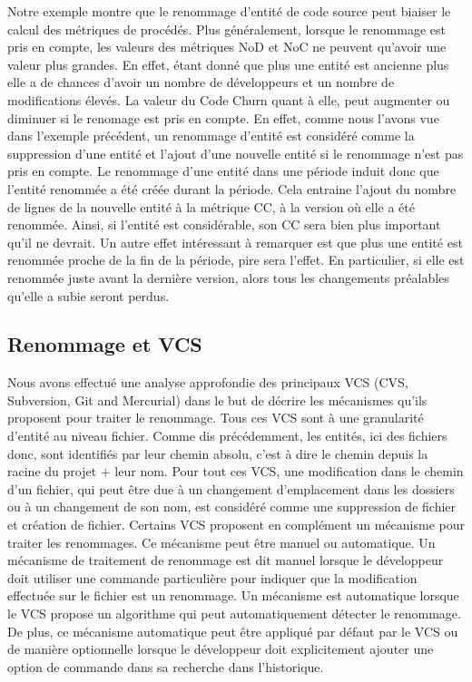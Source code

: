 Notre exemple montre que le renommage d'entité de code source peut biaiser le calcul des métriques de procédés. Plus généralement, lorsque le renommage est pris en compte, les valeurs des métriques NoD et NoC ne peuvent qu'avoir une valeur plus grandes. En effet, étant donné que plus une entité est ancienne plus elle a de chances d'avoir un nombre de développeurs et un nombre de modifications élevés. La valeur du Code Churn quant à elle, peut augmenter ou diminuer si le renomage est pris en compte. En effet, comme nous l'avons vue dans l'exemple précédent, un renommage d'entité est considéré comme la suppression d'une entité et l'ajout d'une nouvelle entité si le renommage n'est pas pris en compte. Le renommage d'une entité dans une période induit donc que l'entité renommée a été créée durant la période. Cela entraine l'ajout du nombre de lignes de la nouvelle entité à la métrique CC, à la version où elle a été renommée. Ainsi, si l'entité est considérable, son CC sera bien plus important qu'il ne devrait. Un autre effet intéressant à remarquer est que plus une entité est renommée proche de la fin de la période, pire sera l'effet. En particulier, si elle est renommée juste avant la dernière version, alors tous les changements préalables qu'elle a subie seront perdus.\\

\subsection{Renommage et VCS}

Nous avons effectué une analyse approfondie des principaux VCS (CVS, Subversion, Git and Mercurial) dans le but de décrire les mécanismes qu'ils proposent pour traiter le renommage. Tous ces VCS sont à une granularité d'entité au niveau fichier. Comme dis précédemment, les entités, ici des fichiers donc, sont identifiés par leur chemin absolu, c'est à dire le chemin depuis la racine du projet $+$ leur nom. Pour tout ces VCS, une modification dans le chemin d'un fichier, qui peut être due à un changement d'emplacement dans les dossiers ou à un changement de son nom, est considéré comme une suppression de fichier et création de fichier. Certains VCS proposent en complément un mécanisme pour traiter les renommages. Ce mécanisme peut être manuel ou automatique. Un mécanisme de traitement de renommage est dit manuel lorsque le développeur doit utiliser une commande particulière pour indiquer que la modification effectuée sur le fichier est un renommage. Un mécanisme est automatique lorsque le VCS propose un algorithme qui peut automatiquement détecter le renommage. De plus, ce mécanisme automatique peut être appliqué par défaut par le VCS ou de manière optionnelle lorsque le développeur doit explicitement ajouter une option de commande dans sa recherche dans l'historique.\\
 
